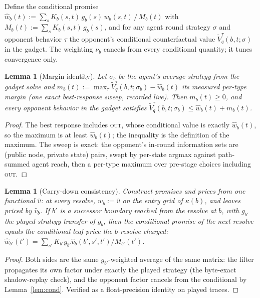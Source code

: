 \documentclass[11pt]{article}
\theoremstyle{plain}
\newtheorem{lemma}[theorem]{Lemma}
\theoremstyle{definition}
\theoremstyle{remark}
\begin{document}
Define the conditional promise
$\hat w_b(t) := \sum_s K_b(s,t)\,g_b(s)\,w_b(s,t) \,/\, M_b(t)$ with
$M_b(t) := \sum_s K_b(s,t)\,g_b(s)$, and for any agent round strategy
$\sigma$ and opponent behavior $\tau$ the opponent's conditional
counterfactual value $\tilde V^{\tau}_q(b,t;\sigma)$ in the gadget.
The weighting $\nu_b$ cancels from every conditional quantity; it
tunes convergence only.

\begin{lemma}[Margin identity]\label{lem:margin}
Let $\sigma_b$ be the agent's average strategy from the gadget solve
and $m_b(t) := \max_{\tau} \tilde V^{\tau}_q(b,t;\sigma_b) - \hat w_b(t)$
its measured per-type margin (one exact best-response sweep, recorded
live). Then $m_b(t)\ge0$, and every opponent behavior in the gadget
satisfies $\tilde V^{\tau}_q(b,t;\sigma_b) \le \hat w_b(t)+m_b(t)$.
\end{lemma}

\begin{proof}
The best response includes \textsc{out}, whose conditional value is
exactly $\hat w_b(t)$, so the maximum is at least $\hat w_b(t)$; the
inequality is the definition of the maximum. The sweep is exact: the
opponent's in-round information sets are (public node, private state)
pairs, swept by per-state argmax against path-summed agent reach, then
a per-type maximum over pre-stage choices including \textsc{out}.
\end{proof}

\begin{lemma}[Carry-down consistency]\label{lem:carry}
Construct promises and prices from \emph{one} functional $\hat v$: at
every resolve, $w_b := \hat v$ on the entry grid of $\kappa(b)$, and
leaves priced by $\hat v_b$. If $b'$ is a successor boundary reached
from the resolve at $b$, with $g_{b'}$ the played-strategy transfer of
$g_b$, then the conditional promise of the next resolve equals the
conditional leaf price the $b$-resolve charged:
$\hat w_{b'}(t') = \sum_{s'} K_{b'}g_{b'}\hat v_b(b',s',t')/M_{b'}(t')$.
\end{lemma}

\begin{proof}
Both sides are the same $g_{b'}$-weighted average of the same matrix:
the filter propagates its own factor under exactly the played strategy
(the byte-exact shadow-replay check), and the opponent factor cancels
from the conditional by Lemma~\ref{lem:cond}. Verified as a
float-precision identity on played traces.
\end{proof}
\end{document}
